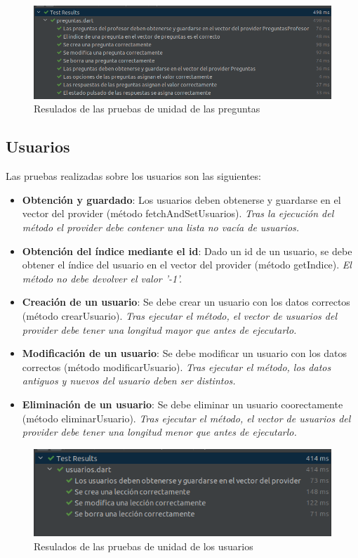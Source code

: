 \begin{figure}[H]
    \centering
    \includegraphics[width=\textwidth]{imagenes/c8/pruebapreguntas.png}
    \caption{Resulados de las pruebas de unidad de las preguntas}
    \label{fig:pruebas_unidad_preguntas}
\end{figure}


\subsection{Usuarios}
\label{subsec:pruebas-unidad-usuarios}
Las pruebas realizadas sobre los usuarios son las siguientes:
\begin{itemize}
    \item \textbf{Obtención y guardado}: Los usuarios deben obtenerse y guardarse en el vector del provider (método fetchAndSetUsuarios). \textit{Tras la ejecución del método el provider debe contener una lista no vacía de usuarios.}
    \item \textbf{Obtención del índice mediante el id}: Dado un id de un usuario, se debe obtener el índice del usuario en el vector del provider (método getIndice). \textit{El método no debe devolver el valor '-1'.}
    \item \textbf{Creación de un usuario}: Se debe crear un usuario con los datos correctos (método crearUsuario). \textit{Tras ejecutar el método, el vector de usuarios del provider debe tener una longitud mayor que antes de ejecutarlo.}
    \item \textbf{Modificación de un usuario}: Se debe modificar un usuario con los datos correctos (método modificarUsuario). \textit{Tras ejecutar el método, los datos antiguos y nuevos del usuario deben ser distintos.}
    \item \textbf{Eliminación de un usuario}: Se debe eliminar un usuario coorectamente (método eliminarUsuario). \textit{Tras ejecutar el método, el vector de usuarios del provider debe tener una longitud menor que antes de ejecutarlo.}
\end{itemize}

\begin{figure}[H]
    \centering
    \includegraphics[width=\textwidth]{imagenes/c8/pruebausuarios.png}
    \caption{Resulados de las pruebas de unidad de los usuarios}
    \label{fig:pruebas_unidad_usuarios}
\end{figure}

